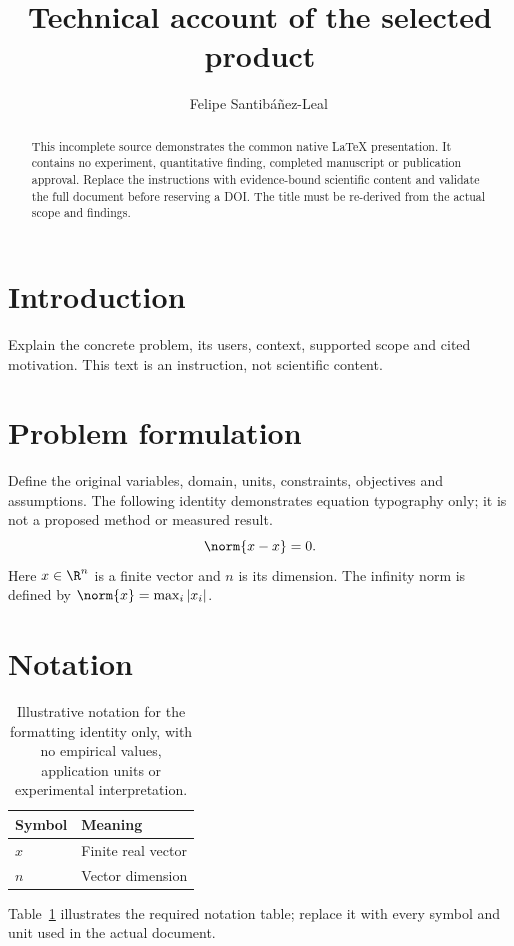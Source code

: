 \documentclass[11pt]{article}
\title{Technical account of the selected product}
\author{Felipe Santib\'a\~nez-Leal\,\orcidlink{0000-0002-0150-3246}}
\date{\docdate}
\begin{document}
\maketitle
\thispagestyle{plain}
\headerblock
\begin{abstract}
This incomplete source demonstrates the common native LaTeX presentation. It contains no experiment, quantitative finding, completed manuscript or publication approval. Replace the instructions with evidence-bound scientific content and validate the full document before reserving a DOI. The title must be re-derived from the actual scope and findings.
\end{abstract}

\section{Introduction}\label{sec:introduction}
Explain the concrete problem, its users, context, supported scope and cited motivation. This text is an instruction, not scientific content.

\section{Problem formulation}\label{sec:problem-formulation}
Define the original variables, domain, units, constraints, objectives and assumptions. The following identity demonstrates equation typography only; it is not a proposed method or measured result.
\begin{equation}\label{eq:identity} \norm{x-x} = 0. \end{equation}
Here $x\in\R^n$ is a finite vector and $n$ is its dimension. The infinity norm is defined by $\norm{x}=\max_i |x_i|$.

\section{Notation}\label{sec:notation}
\begin{table}[ht]\centering
\caption{Illustrative notation for the formatting identity only, with no empirical values, application units or experimental interpretation.}\label{tab:notation}
\begin{tabular}{ll}\toprule Symbol & Meaning \\\midrule $x$ & Finite real vector \\ $n$ & Vector dimension \\\bottomrule\end{tabular}
\end{table}
Table~\ref{tab:notation} illustrates the required notation table; replace it with every symbol and unit used in the actual document.
\end{document}
